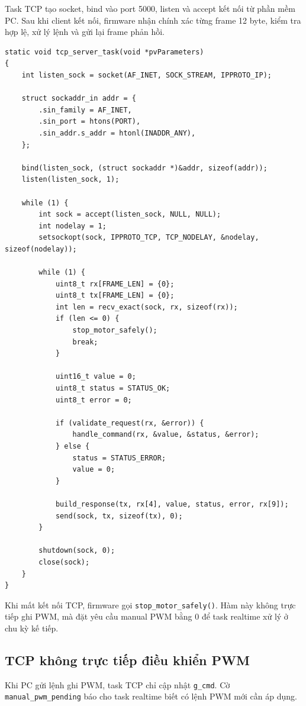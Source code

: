 \documentclass[12pt,a4paper]{report}
\begin{document}
Task TCP tạo socket, bind vào port 5000, listen và accept kết nối từ phần mềm PC. Sau khi client kết nối, firmware nhận chính xác từng frame 12 byte, kiểm tra hợp lệ, xử lý lệnh và gửi lại frame phản hồi.

\begin{lstlisting}
static void tcp_server_task(void *pvParameters)
{
    int listen_sock = socket(AF_INET, SOCK_STREAM, IPPROTO_IP);

    struct sockaddr_in addr = {
        .sin_family = AF_INET,
        .sin_port = htons(PORT),
        .sin_addr.s_addr = htonl(INADDR_ANY),
    };

    bind(listen_sock, (struct sockaddr *)&addr, sizeof(addr));
    listen(listen_sock, 1);

    while (1) {
        int sock = accept(listen_sock, NULL, NULL);
        int nodelay = 1;
        setsockopt(sock, IPPROTO_TCP, TCP_NODELAY, &nodelay, sizeof(nodelay));

        while (1) {
            uint8_t rx[FRAME_LEN] = {0};
            uint8_t tx[FRAME_LEN] = {0};
            int len = recv_exact(sock, rx, sizeof(rx));
            if (len <= 0) {
                stop_motor_safely();
                break;
            }

            uint16_t value = 0;
            uint8_t status = STATUS_OK;
            uint8_t error = 0;

            if (validate_request(rx, &error)) {
                handle_command(rx, &value, &status, &error);
            } else {
                status = STATUS_ERROR;
                value = 0;
            }

            build_response(tx, rx[4], value, status, error, rx[9]);
            send(sock, tx, sizeof(tx), 0);
        }

        shutdown(sock, 0);
        close(sock);
    }
}
\end{lstlisting}

Khi mất kết nối TCP, firmware gọi \texttt{stop\_motor\_safely()}. Hàm này không trực tiếp ghi PWM, mà đặt yêu cầu manual PWM bằng 0 để task realtime xử lý ở chu kỳ kế tiếp.

\subsection{TCP không trực tiếp điều khiển PWM}

Khi PC gửi lệnh ghi PWM, task TCP chỉ cập nhật \texttt{g\_cmd}. Cờ \texttt{manual\_pwm\_pending} báo cho task realtime biết có lệnh PWM mới cần áp dụng.
\end{document}
